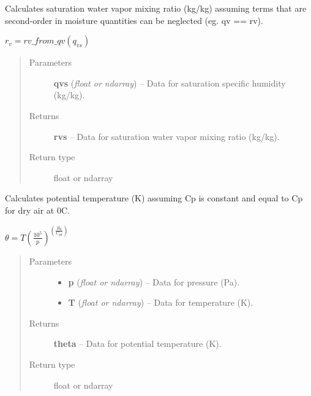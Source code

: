 \documentclass[letterpaper,10pt,english]{sphinxmanual}
\begin{document}

\begin{fulllineitems}
\label{atmos:atmos.equations.rvs_from_qvs_lwv}
Calculates saturation water vapor mixing ratio (kg/kg) assuming terms that are
second-order in moisture quantities can be neglected (eg. qv == rv).

\(r_v = rv\_from\_qv(q_{vs})\)
\begin{quote}\begin{description}
\item[{Parameters}] \leavevmode
\textbf{qvs} (\emph{float or ndarray}) -- Data for saturation specific humidity (kg/kg).

\item[{Returns}] \leavevmode
\textbf{rvs} --
Data for saturation water vapor mixing ratio (kg/kg).

\item[{Return type}] \leavevmode
float or ndarray

\end{description}\end{quote}

\end{fulllineitems}


\begin{fulllineitems}
\label{atmos:atmos.equations.theta_from_p_T}
Calculates potential temperature (K) assuming Cp is constant and equal to Cp for
dry air at 0C.

\(\theta = T (\frac{10^5}{p})^(\frac{R_d}{C_{pd}})\)
\begin{quote}\begin{description}
\item[{Parameters}] \leavevmode\begin{itemize}
\item {} 
\textbf{p} (\emph{float or ndarray}) -- Data for pressure (Pa).

\item {} 
\textbf{T} (\emph{float or ndarray}) -- Data for temperature (K).

\end{itemize}

\item[{Returns}] \leavevmode
\textbf{theta} --
Data for potential temperature (K).

\item[{Return type}] \leavevmode
float or ndarray

\end{description}\end{quote}

\end{fulllineitems}
\end{document}

